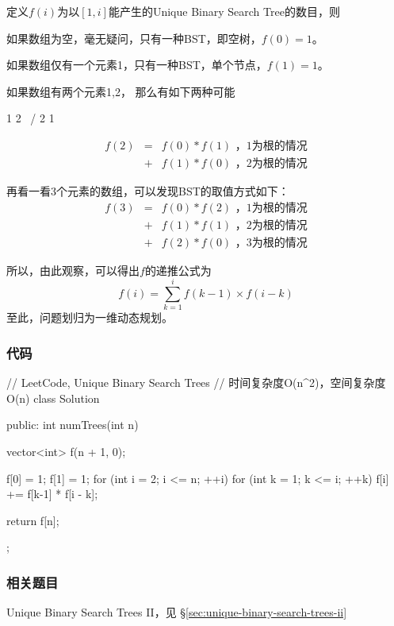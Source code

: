 定义$f(i)$为以$[1,i]$能产生的Unique Binary Search Tree的数目，则

如果数组为空，毫无疑问，只有一种BST，即空树，$f(0)=1$。

如果数组仅有一个元素{1}，只有一种BST，单个节点，$f(1)=1$。

如果数组有两个元素{1,2}， 那么有如下两种可能
\begin{Code}
1             2
  \          /
    2      1
\end{Code}

\begin{eqnarray}
f(2) &=& f(0) * f(1)   \text{ ，1为根的情况} \nonumber \\
     &+& f(1) * f(0)   \text{ ，2为根的情况} \nonumber
\end{eqnarray}

再看一看3个元素的数组，可以发现BST的取值方式如下：
\begin{eqnarray}
f(3) &=& f(0) * f(2)   \text{ ，1为根的情况} \nonumber \\
     &+& f(1) * f(1)   \text{ ，2为根的情况} \nonumber \\
     &+& f(2) * f(0)   \text{ ，3为根的情况} \nonumber
\end{eqnarray}

所以，由此观察，可以得出$f$的递推公式为
$$
f(i) = \sum_{k=1}^{i} f(k-1) \times f(i-k)
$$
至此，问题划归为一维动态规划。


\subsubsection{代码}

\begin{Code}
// LeetCode, Unique Binary Search Trees
// 时间复杂度O(n^2)，空间复杂度O(n)
class Solution {
public:
    int numTrees(int n) {
        vector<int> f(n + 1, 0);

        f[0] = 1;
        f[1] = 1;
        for (int i = 2; i <= n; ++i) {
            for (int k = 1; k <= i; ++k)
                f[i] += f[k-1] * f[i - k];
        }

        return f[n];
    }
};
\end{Code}


\subsubsection{相关题目}
\begindot
\item Unique Binary Search Trees II，见 \S \ref{sec:unique-binary-search-trees-ii}
\myenddot


